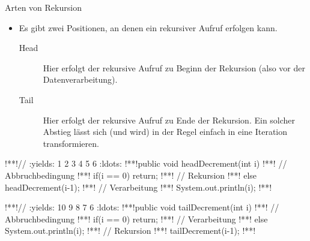 \begin{frame}[fragile]{Arten von Rekursion}
    \begin{itemize}[<+(1)->]
        \widei
        \item Es gibt zwei Positionen, an denen ein rekursiver Aufruf erfolgen kann.\begin{description}
            \item[Head] Hier erfolgt der rekursive Aufruf zu Beginn der Rekursion (also vor der Datenverarbeitung).
            \item[Tail] Hier erfolgt der rekursive Aufruf zu Ende der Rekursion.\pause{} Ein solcher Abstieg lässt sich (und wird) in der Regel einfach in eine Iteration transformieren.
        \end{description}
    \end{itemize}
\begin{center}\scriptsize%
\begin{minipage}{0.45\linewidth}
\begin{plainjava}
!**!// :yields: 1 2 3 4 5 6 :ldots:
!**!public void headDecrement(int i){
!**!    // Abbruchbedingung
!**!    if(i == 0) return;
!**!    // Rekursion
!**!    else headDecrement(i-1);
!**!    // Verarbeitung
!**!    System.out.println(i);
!**!}
\end{plainjava}
\end{minipage}\qquad\begin{minipage}{0.45\linewidth}
\begin{plainjava}
!**!// :yields: 10 9 8 7 6 :ldots:
!**!public void tailDecrement(int i){
!**!    // Abbruchbedingung
!**!    if(i == 0) return;
!**!    // Verarbeitung
!**!    else System.out.println(i);
!**!    // Rekursion
!**!    tailDecrement(i-1);
!**!}
\end{plainjava}
\end{minipage}
\end{center}
\end{frame}

